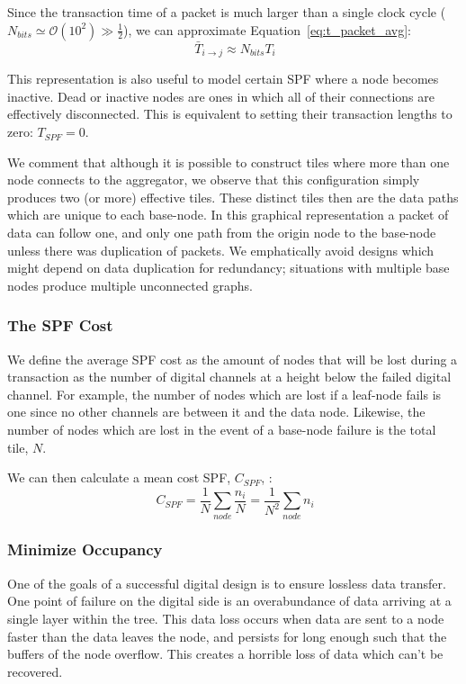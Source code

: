 Since the transaction time of a packet is much larger than a single clock cycle ($N_{bits} \simeq \mathcal{O}(10^{2}) \gg \frac{1}{2}$), we can approximate Equation~\ref{eq:t_packet_avg}:
\begin{equation}~\label{eq:t_packet}
\bar{T}_{i\rightarrow j} \approx N_{bits}T_{i}
\end{equation}

This representation is also useful to model certain SPF where a node becomes inactive.
Dead or inactive nodes are ones in which all of their connections are effectively disconnected.
This is equivalent to setting their transaction lengths to zero: $T_{SPF} = 0$.

We comment that although it is possible to construct tiles where more than one node connects to the aggregator, we observe that this configuration simply produces two (or more) effective tiles.
These distinct tiles then are the data paths which are unique to each base-node.
In this graphical representation a packet of data can follow one, and only one path from the origin node to the base-node unless there was duplication of packets.
We emphatically avoid designs which might depend on data duplication for redundancy; situations with multiple base nodes produce multiple unconnected graphs.

\subsubsection{The SPF Cost}\label{sec:spf_cost}
We define the average SPF cost as the amount of nodes that will be lost during a transaction as the number of digital channels at a height below the failed digital channel.
For example, the number of nodes which are lost if a leaf-node fails is one since no other channels are between it and the data node.
Likewise, the number of nodes which are lost in the event of a base-node failure is the total tile, $N$.

We can then calculate a mean cost SPF, $C_{SPF}$, :
\begin{equation}~\label{eq:cspf}
  C_{SPF} = \frac{1}{N}\sum_{node} \frac{n_{i}}{N} = \frac{1}{N^{2}}\sum_{node} n_{i}
\end{equation}

\subsubsection{Minimize Occupancy}\label{sec:min_conn}
One of the goals of a successful digital design is to ensure lossless data transfer.
One point of failure on the digital side is an overabundance of data arriving at a single layer within the tree.
This data loss occurs when data are sent to a node faster than the data leaves the node, and persists for long enough such that the buffers of the node overflow.
This creates a horrible loss of data which can't be recovered.

